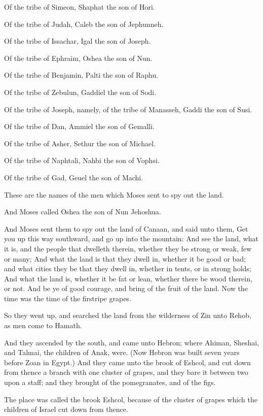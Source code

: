 \verse Of the tribe of Simeon, Shaphat the son of Hori.

\verse Of the tribe of Judah, Caleb the son of Jephunneh.

\verse Of the tribe of Issachar, Igal the son of Joseph.

\verse Of the tribe of Ephraim, Oshea the son of Nun.

\verse Of the tribe of Benjamin, Palti the son of Raphu.

\verse Of the tribe of Zebulun, Gaddiel the son of Sodi.

\verse Of the tribe of Joseph, namely, of the tribe of Manasseh, Gaddi
the son of Susi.

\verse Of the tribe of Dan, Ammiel the son of Gemalli.

\verse Of the tribe of Asher, Sethur the son of Michael.

\verse Of the tribe of Naphtali, Nahbi the son of Vophsi.

\verse Of the tribe of Gad, Geuel the son of Machi.

\verse These are the names of the men which Moses sent to spy out the
land.

And Moses called Oshea the son of Nun Jehoshua.

\verse And Moses sent them to spy out the land of Canaan, and said unto
them, Get you up this way southward, and go up into the mountain:
\verse And see the land, what it is, and the people that dwelleth
therein, whether they be strong or weak, few or many; \verse And what
the land is that they dwell in, whether it be good or bad; and what
cities they be that they dwell in, whether in tents, or in strong
holds; \verse And what the land is, whether it be fat or lean, whether
there be wood therein, or not. And be ye of good courage, and bring of
the fruit of the land. Now the time was the time of the firstripe
grapes.

\verse So they went up, and searched the land from the wilderness of
Zin unto Rehob, as men come to Hamath.

\verse And they ascended by the south, and came unto Hebron; where
Ahiman, Sheshai, and Talmai, the children of Anak, were. (Now Hebron
was built seven years before Zoan in Egypt.)  \verse And they came unto
the brook of Eshcol, and cut down from thence a branch with one
cluster of grapes, and they bare it between two upon a staff; and they
brought of the pomegranates, and of the figs.

\verse The place was called the brook Eshcol, because of the cluster of
grapes which the children of Israel cut down from thence.


